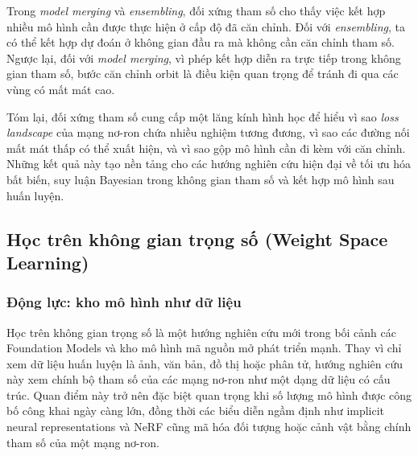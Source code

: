 Trong \textit{model merging} và \textit{ensembling}, đối xứng tham số cho thấy việc kết hợp nhiều mô hình cần được thực hiện ở cấp độ đã căn chỉnh. Đối với \textit{ensembling}, ta có thể kết hợp dự đoán ở không gian đầu ra mà không cần căn chỉnh tham số. Ngược lại, đối với \textit{model merging}, vì phép kết hợp diễn ra trực tiếp trong không gian tham số, bước căn chỉnh orbit là điều kiện quan trọng để tránh đi qua các vùng có mất mát cao.

Tóm lại, đối xứng tham số cung cấp một lăng kính hình học để hiểu vì sao \textit{loss landscape} của mạng nơ-ron chứa nhiều nghiệm tương đương, vì sao các đường nối mất mát thấp có thể xuất hiện, và vì sao gộp mô hình cần đi kèm với căn chỉnh. Những kết quả này tạo nền tảng cho các hướng nghiên cứu hiện đại về tối ưu hóa bất biến, suy luận Bayesian trong không gian tham số và kết hợp mô hình sau huấn luyện.


\subsection{Học trên không gian trọng số (Weight Space Learning)}
\label{subsec:weight-space-learning}


\subsubsection{Động lực: kho mô hình như dữ liệu}

Học trên không gian trọng số là một hướng nghiên cứu mới trong bối cảnh các Foundation Models và kho mô hình mã nguồn mở phát triển mạnh. Thay vì chỉ xem dữ liệu huấn luyện là ảnh, văn bản, đồ thị hoặc phân tử, hướng nghiên cứu này xem chính bộ tham số của các mạng nơ-ron như một dạng dữ liệu có cấu trúc. Quan điểm này trở nên đặc biệt quan trọng khi số lượng mô hình được công bố công khai ngày càng lớn, đồng thời các biểu diễn ngầm định như implicit neural representations và NeRF cũng mã hóa đối tượng hoặc cảnh vật bằng chính tham số của một mạng nơ-ron.

